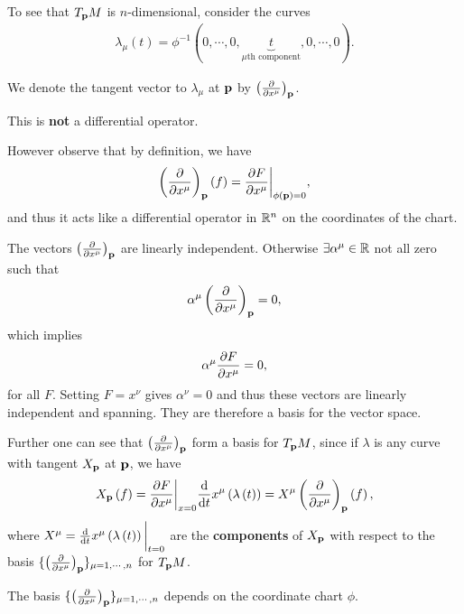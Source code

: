 To see that $T_{\vb{p}}M$ is $n$-dimensional, consider the curves
\begin{align}
    \lambda_{\mu} \left( t \right) = \phi ^{-1} \left( 0, \cdots, 0, \underbrace{t}_{\mu\text{th component}},0,\cdots, 0 \right) 
.\end{align}

We denote the tangent vector to $\lambda_\mu$ at $\vb{p}$ by $\left( \pdv{x^{\mu}} \right)_{\vb{p}} $. 

\begin{note}
    This is \textbf{not} a differential operator.
\end{note}

However observe that by definition, we have
\begin{align}
    \left( \pdv{x^{\mu}} \right)_{\vb{p}}\left( f \right) = \pdv{F}{x^{\mu}} \bigg|_{\phi \left( \vb{p} \right) = 0}
,\end{align}
and thus it acts like a differential operator in $\mathbb{R}^{n}$ on the coordinates of the chart.

The vectors $\left( \pdv{x^{\mu}} \right)_{\vb{p}}$ are linearly independent. Otherwise $\exists  \alpha^{\mu} \in \mathbb{R}$ not all zero such that
\begin{align}
    \alpha^{\mu} \left( \pdv{x^{\mu}} \right)_{\vb{p}}  = 0
,\end{align}
which implies
\begin{align}
    \alpha^{\mu} \pdv{F}{x^{\mu}} = 0
,\end{align}
for all $F$. Setting $F = x^{\nu}$ gives $\alpha^{\nu} = 0$ and thus these vectors are linearly independent and spanning. They are therefore a basis for the vector space.

Further one can see that $\left( \pdv{x^{\mu}} \right)_{\vb{p}} $ form a basis for $T_{\vb{p}}M$, since if $\lambda$ is any curve with tangent $X_{\vb{p}}$ at $\vb{p}$, we have
\begin{align}
    X_{\vb{p}} \left( f \right) = \pdv{F}{x^{\mu}} \bigg|_{x=0} \dv{t} x^{\mu} \left( \lambda \left( t \right)  \right) = X^{\mu} \left( \pdv{x^{\mu}} \right)_{\vb{p}} \left( f \right) 
,\end{align}
where $X^{\mu} = \dv{t} x^{\mu} \left( \lambda \left( t \right)  \right) \bigg|_{t= 0}$ are the \textbf{components} of $X_{\vb{p}}$ with respect to the basis $\{\left( \pdv{x^{\mu}} \right)_{\vb{p}} \}_{\mu = 1,\cdots,n} $ for $T_{\vb{p}}M$.

\begin{note}
    The basis $\{\left( \pdv{x^{\mu}} \right)_{\vb{p}} \}_{\mu = 1,\cdots,n} $ depends on the coordinate chart $\phi$.
\end{note}

